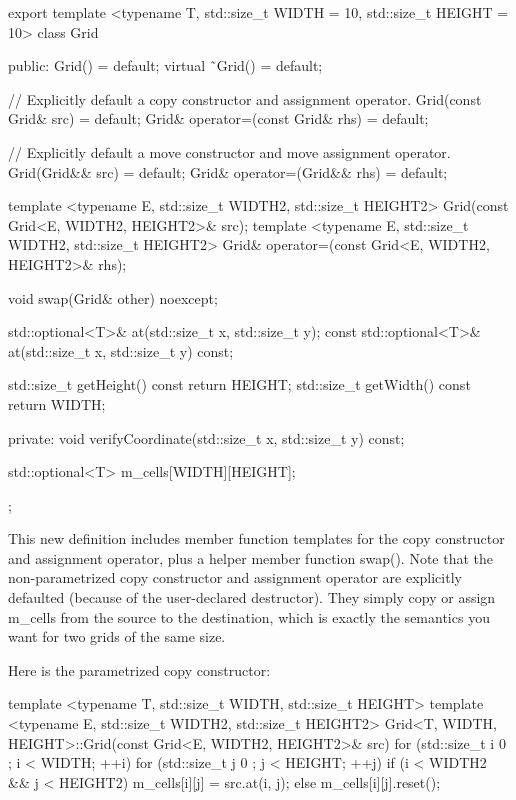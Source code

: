 \begin{cpp}
export template <typename T, std::size_t WIDTH = 10, std::size_t HEIGHT = 10>
class Grid
{
    public:
        Grid() = default;
        virtual ˜Grid() = default;

        // Explicitly default a copy constructor and assignment operator.
        Grid(const Grid& src) = default;
        Grid& operator=(const Grid& rhs) = default;

        // Explicitly default a move constructor and move assignment operator.
        Grid(Grid&& src) = default;
        Grid& operator=(Grid&& rhs) = default;

        template <typename E, std::size_t WIDTH2, std::size_t HEIGHT2>
        Grid(const Grid<E, WIDTH2, HEIGHT2>& src);
        template <typename E, std::size_t WIDTH2, std::size_t HEIGHT2>
        Grid& operator=(const Grid<E, WIDTH2, HEIGHT2>& rhs);

        void swap(Grid& other) noexcept;

        std::optional<T>& at(std::size_t x, std::size_t y);
        const std::optional<T>& at(std::size_t x, std::size_t y) const;

        std::size_t getHeight() const { return HEIGHT; }
        std::size_t getWidth() const { return WIDTH; }

    private:
        void verifyCoordinate(std::size_t x, std::size_t y) const;

        std::optional<T> m_cells[WIDTH][HEIGHT];
};
\end{cpp}

This new definition includes member function templates for the copy constructor and assignment operator, plus a helper member function swap(). Note that the non-parametrized copy constructor and assignment operator are explicitly defaulted (because of the user-declared destructor). They simply copy or assign m\_cells from the source to the destination, which is exactly the semantics you want for two grids of the same size.

Here is the parametrized copy constructor:

\begin{cpp}
template <typename T, std::size_t WIDTH, std::size_t HEIGHT>
template <typename E, std::size_t WIDTH2, std::size_t HEIGHT2>
Grid<T, WIDTH, HEIGHT>::Grid(const Grid<E, WIDTH2, HEIGHT2>& src)
{
    for (std::size_t i { 0 }; i < WIDTH; ++i) {
        for (std::size_t j { 0 }; j < HEIGHT; ++j) {
            if (i < WIDTH2 && j < HEIGHT2) {
                m_cells[i][j] = src.at(i, j);
            } else {
                m_cells[i][j].reset();
            }
        }
    }
}
\end{cpp}

